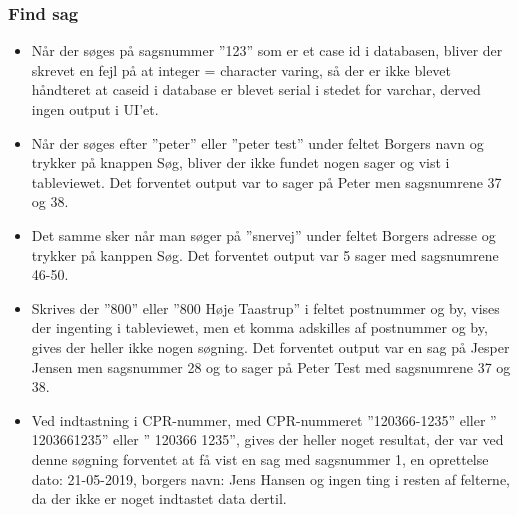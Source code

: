 \subsubsection{Find sag}
\begin{itemize}
\item Når der søges på sagsnummer ”123” som er et case id i databasen, bliver der skrevet en fejl på at integer = character varing, så der er ikke blevet håndteret at caseid i database er blevet serial i stedet for varchar, derved ingen output i UI’et.
\item Når der søges efter ”peter” eller ”peter test” under feltet Borgers navn og trykker på knappen Søg, bliver der ikke fundet nogen sager og vist i tableviewet. Det forventet output var to sager på Peter men sagsnumrene 37 og 38.
\item Det samme sker når man søger på ”snervej” under feltet Borgers adresse og trykker på kanppen Søg. Det forventet output var 5 sager med sagsnumrene 46-50.
\item Skrives der ”800” eller ”800 Høje Taastrup” i feltet postnummer og by, vises der ingenting i tableviewet, men et komma adskilles af postnummer og by, gives der heller ikke nogen søgning. Det forventet output var en sag på Jesper Jensen men sagsnummer 28 og to sager på Peter Test med sagsnumrene 37 og 38.
\item Ved indtastning i CPR-nummer, med CPR-nummeret ”120366-1235” eller ” 1203661235” eller ” 120366 1235”, gives der heller noget resultat, der var ved denne søgning forventet at få vist en sag med sagsnummer 1, en oprettelse dato: 21-05-2019, borgers navn: Jens Hansen og ingen ting i resten af felterne, da der ikke er noget indtastet data dertil.
\end{itemize}
